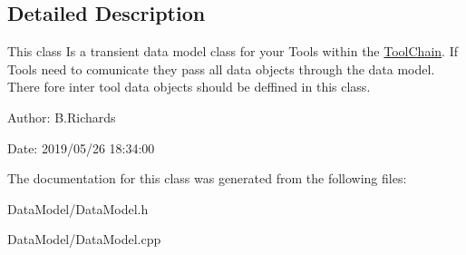 \subsection{Detailed Description}
This class Is a transient data model class for your Tools within the \hyperlink{classToolChain}{Tool\-Chain}. If Tools need to comunicate they pass all data objects through the data model. There fore inter tool data objects should be deffined in this class.

\begin{DoxyParagraph}{Author\-:}
B.\-Richards 
\end{DoxyParagraph}
\begin{DoxyParagraph}{Date\-:}
2019/05/26 18\-:34\-:00 
\end{DoxyParagraph}


The documentation for this class was generated from the following files\-:\begin{DoxyCompactItemize}
\item 
Data\-Model/Data\-Model.\-h\item 
Data\-Model/Data\-Model.\-cpp\end{DoxyCompactItemize}
